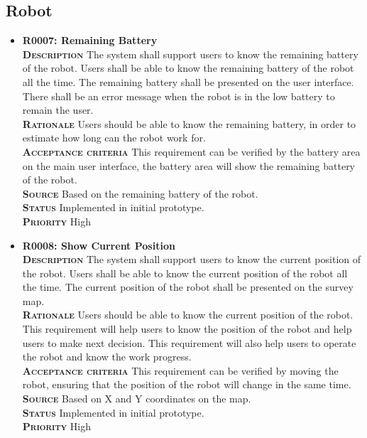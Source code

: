 \documentclass[11pt, a4paper]{article}
\begin{document}
\subsection{Robot}
\begin{itemize}
\item {\bfseries R0007: Remaining Battery}\\
\textsc{\bfseries Description} The system shall support users to know the remaining battery of the robot. Users shall be able to know the remaining battery of the robot all the time. The remaining battery shall be presented on the user interface. There shall be an error message when the robot is in the low battery to remain the user.\\
\textsc{\bfseries Rationale} Users should be able to know the remaining battery, in order to estimate how long can the robot work for.\\
\textsc{\bfseries Acceptance criteria} This requirement can be verified by the battery area on the main user interface, the battery area will show the remaining battery of the robot.\\
\textsc{\bfseries Source} Based on the remaining battery of the robot.\\
\textsc{\bfseries Status} Implemented in initial prototype.\\
\textsc{\bfseries Priority} High\\

\item {\bfseries R0008: Show Current Position}\\
\textsc{\bfseries Description} The system shall support users to know the current position of the robot. Users shall be able to know the current position of the robot all the time. The current position of the robot shall be presented on the survey map.\\
\textsc{\bfseries Rationale} Users should be able to know the current position of the robot. This requirement will help users to know the position of the robot and help users to make next decision. This requirement will also help users to operate the robot and know the work progress.\\
\textsc{\bfseries Acceptance criteria} This requirement can be verified by moving the robot, ensuring that the position of the robot will change in the same time.\\
\textsc{\bfseries Source} Based on X and Y coordinates on the map.\\
\textsc{\bfseries Status} Implemented in initial prototype.\\
\textsc{\bfseries Priority} High\\


\end{itemize}
\end{document}
